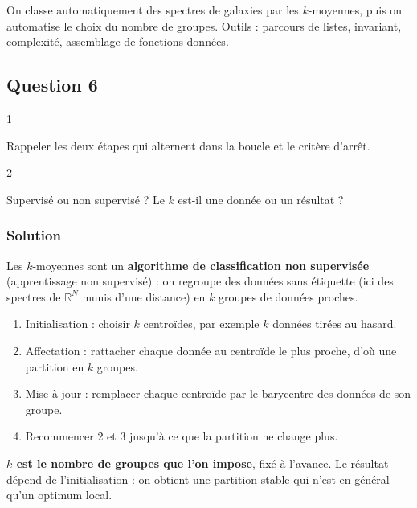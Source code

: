 \documentclass[11pt,a4paper]{article}
\providecommand{\tightlist}{\setlength{\itemsep}{0pt}\setlength{\parskip}{0pt}}
\begin{document}
On classe automatiquement des spectres de galaxies par les \(k\)-moyennes, puis on automatise le choix du nombre de groupes. Outils : parcours de listes, invariant, complexité, assemblage de fonctions données.

\hypertarget{question-6}{%
\subsection{Question 6}\label{question-6}}

\begin{indication}{1}

Rappeler les deux étapes qui alternent dans la boucle et le critère d'arrêt.

\end{indication}

\begin{indication}{2}

Supervisé ou non supervisé ? Le \(k\) est-il une donnée ou un résultat ?

\end{indication}

\hypertarget{solution-5}{%
\subsubsection{Solution}\label{solution-5}}

Les \(k\)-moyennes sont un \textbf{algorithme de classification non supervisée} (apprentissage non supervisé) : on regroupe des données sans étiquette (ici des spectres de \({\mathbb{R}}^N\) munis d'une distance) en \(k\) groupes de données proches.

\begin{enumerate}
\def\labelenumi{\arabic{enumi}.}
\tightlist
\item
  Initialisation : choisir \(k\) centroïdes, par exemple \(k\) données tirées au hasard.
\item
  Affectation : rattacher chaque donnée au centroïde le plus proche, d'où une partition en \(k\) groupes.
\item
  Mise à jour : remplacer chaque centroïde par le barycentre des données de son groupe.
\item
  Recommencer 2 et 3 jusqu'à ce que la partition ne change plus.
\end{enumerate}

\textbf{\(k\) est le nombre de groupes que l'on impose}, fixé à l'avance. Le résultat dépend de l'initialisation : on obtient une partition stable qui n'est en général qu'un optimum local.
\end{document}
